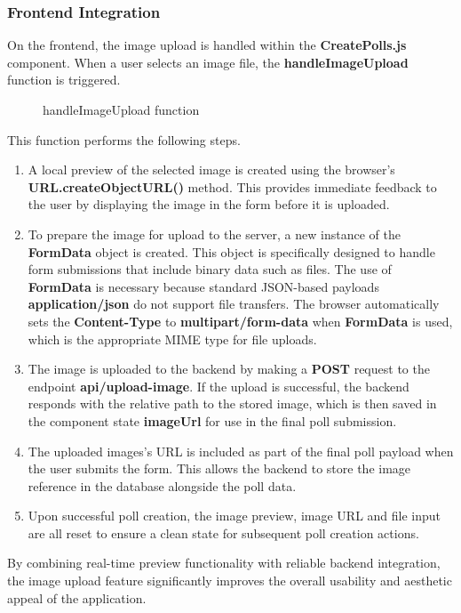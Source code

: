 \documentclass[a4paper,12pt]{report}
\begin{document}
\subsubsection{Frontend Integration}
On the frontend, the image upload is handled within the \textbf{CreatePolls.js} component. When a user selects an image file, the \textbf{handleImageUpload} function is triggered. 
\begin{figure}[H]
	\caption{handleImageUpload function}
	\label{fig:handleImageUpload}
\end{figure}
\noindent
This function performs the following steps.
\begin{enumerate}
	\item A local preview of the selected image is created using the browser's \textbf{URL.createObjectURL()} method. This provides immediate feedback to the user by displaying the image in the form before it is uploaded.
	\item To prepare the image for upload to the server, a new instance of the \textbf{FormData} object is created. This object is specifically designed to handle form submissions that include binary data such as files. The use of \textbf{FormData} is necessary because standard JSON-based payloads \textbf{application/json} do not support file transfers. The browser automatically sets the \textbf{Content-Type} to \textbf{multipart/form-data} when \textbf{FormData} is used, which is the appropriate MIME type for file uploads.
	\item The image is uploaded to the backend by making a \textbf{POST} request to the endpoint \textbf{api/upload-image}. If the upload is successful, the backend responds with the relative path to the stored image, which is then saved in the component state \textbf{imageUrl} for use in the final poll submission.
	\item The uploaded images's URL is included as part of the final poll payload when the user submits the form. This allows the backend to store the image reference in the database alongside the poll data.
	\item Upon successful poll creation, the image preview, image URL and file input are all reset to ensure a clean state for subsequent poll creation actions.
\end{enumerate}
By combining real-time preview functionality with reliable backend integration, the image upload feature significantly improves the overall usability and aesthetic appeal of the application.
\end{document}
